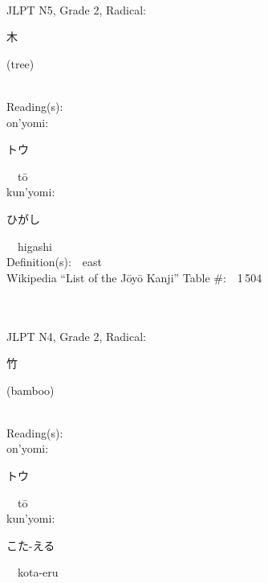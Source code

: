 \begin{multicols}{2}
{\fontsize{34pt}{40pt}  }\ \ \\  %
{JLPT N5, Grade 2, Radical:\ \ {\begin{CJK}{UTF8}{min} 木 \end{CJK}} (tree) } \\
Reading(s):\ \ \\
{\hspace*{1em}}on'yomi:\ \ \\
{\hspace*{2em}}{\begin{CJK}{UTF8}{min} トウ \end{CJK}}\ \ t\=o\ \ \\
{\hspace*{1em}}kun'yomi:\ \ \\
{\hspace*{2em}}{\begin{CJK}{UTF8}{min} ひがし \end{CJK}}\ \ higashi\ \ \\
Definition(s):\ \ east \\
Wikipedia ``List of the J\=oy\=o Kanji'' Table \#:\ \ 1\,504 \\
\ \ \\
{\fontsize{34pt}{40pt}  }\ \ \\  %
{JLPT N4, Grade 2, Radical:\ \ {\begin{CJK}{UTF8}{min} 竹 \end{CJK}} (bamboo) } \\
Reading(s):\ \ \\
{\hspace*{1em}}on'yomi:\ \ \\
{\hspace*{2em}}{\begin{CJK}{UTF8}{min} トウ \end{CJK}}\ \ t\=o\ \ \\
{\hspace*{1em}}kun'yomi:\ \ \\
{\hspace*{2em}}{\begin{CJK}{UTF8}{min} こた-える \end{CJK}}\ \ kota-eru\ \ \\

\end{multicols}
